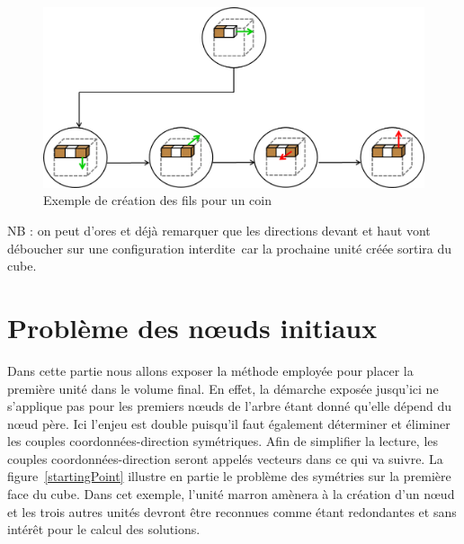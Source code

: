 \begin{figure}[h]
 \centering
 \includegraphics[scale=0.5,keepaspectratio=true]{img/buildCornerChildren.png}
 \caption{Exemple de création des fils pour un coin}
 \label{buildCornerChildren}
\end{figure}

NB : on peut d’ores et déjà remarquer que les directions devant et haut vont déboucher sur une configuration interdite car la prochaine unité créée sortira du cube.

\newpage
\section{Problème des nœuds initiaux}
Dans cette partie nous allons exposer la méthode employée pour 	placer la première unité dans le volume final. En effet, la démarche exposée jusqu’ici ne s’applique pas pour les premiers nœuds de l’arbre étant donné qu’elle dépend du nœud père. Ici l’enjeu est double puisqu’il faut également déterminer et éliminer les couples coordonnées-direction symétriques. Afin de simplifier la lecture, les couples coordonnées-direction seront appelés vecteurs dans ce qui va suivre. La figure~\ref{startingPoint} illustre en partie le problème des symétries sur la première face du cube. Dans cet exemple, l’unité marron amènera à la création d’un nœud et les trois autres unités devront être reconnues comme étant redondantes et sans intérêt pour le calcul des solutions.

